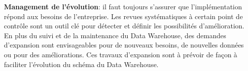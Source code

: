 \textbf{Management de l’évolution}: il faut toujours s’assurer que l’implémentation répond aux besoins de l’entreprise. Les revues systématiques à certain point de contrôle sont un outil clé pour détecter et définir les possibilités d’amélioration. En plus du suivi et de la maintenance du Data Warehouse, des demandes d’expansion sont envisageables pour de nouveaux besoins, de nouvelles données ou pour des améliorations.
Ces travaux d’expansion sont à prévoir de façon à faciliter l’évolution du schéma du
Data Warehouse.




